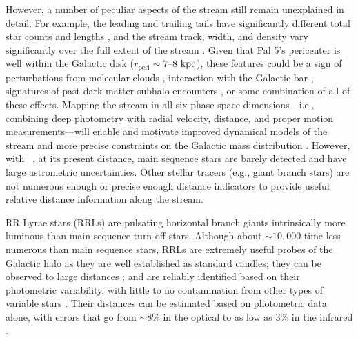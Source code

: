 \documentclass[twocolumn]{aastex63}
\newcommand{\sa}[1]{{\color{teal} SP: #1}}
\begin{document}
However, a number of peculiar aspects of the stream still remain unexplained in detail.
For example, the leading and trailing tails have significantly different total star counts and lengths \citep[both different by a factor of $\sim$2 between leading and trailing;][]{Dehnen:2004, Bernard:2016}, and the stream track, width, and density vary significantly over the full extent of the stream \citep{Ibata:2016, Bonaca:2019}.
Given that Pal 5's pericenter is well within the Galactic disk ($r_{\textrm{peri}} \sim 7$--$8~\mathrm{kpc}$),
these features could be a sign of perturbations from molecular clouds \citep[e.g.,][]{Amorisco:2016}, interaction with the Galactic bar \citep[e.g.,][]{Pearson:2017}, signatures of past dark matter subhalo encounters \citep[e.g.,][]{Erkal:2017}, or some combination of all of these effects.
Mapping the stream in all six phase-space dimensions---i.e., combining deep photometry with radial velocity, distance, and proper motion measurements---will enable and motivate improved dynamical models of the stream and more precise constraints on the Galactic mass distribution \citep[e.g.,][]{PriceWhelan:2013}.
However, with \Gaia\ , at its present distance, main sequence stars are barely detected and have large astrometric uncertainties.
Other stellar tracers (e.g., giant branch stars) are not numerous enough or precise enough distance indicators to provide useful relative distance information along the stream.

RR Lyrae stars (RRLs) are pulsating horizontal branch giants intrinsically more luminous than main sequence turn-off stars. Although about $\sim 10,000$ time less numerous than main sequence stars, RRLs are extremely useful probes of the Galactic halo as they are well established as standard candles; they can be observed to large distances \citep{Medina:2018,Sesar:2017c}; and are reliably identified based on their photometric variability, with little to no contamination from other types of variable stars \citep[e.g.]{Holl:2018,Drake:2017,Mateu:2012}.  Their distances can be estimated based on photometric data alone, with errors that go from $\sim8\%$ in the optical to as low as 3\% in the infrared \citep{Neeley:2017, Sesar:2017a}.
\end{document}
